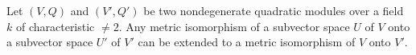 Let $(V, Q)$ and $(V', Q')$ be two nondegenerate quadratic modules over a field $k$ of characteristic $\neq 2$. Any metric isomorphism of a subvector space $U$ of $V$ onto a subvector space $U'$ of $V'$ can be extended to a metric isomorphism of $V$ onto $V'$.
